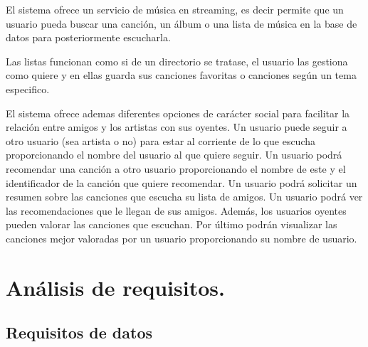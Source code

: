 \documentclass[12pt,a4paper]{article}
\begin{document}
El sistema ofrece un servicio de música en streaming, es decir permite que un usuario pueda buscar una canción, un álbum o una lista de música en la base 
de datos para posteriormente escucharla. 

Las listas funcionan como si de un directorio se tratase, el usuario las gestiona como quiere y en ellas guarda sus canciones favoritas o canciones según un tema especifico.  

El sistema ofrece ademas diferentes opciones de carácter social para facilitar la relación entre amigos y los artistas con sus oyentes. Un usuario puede seguir a otro usuario (sea artista o no) para estar al corriente de lo que escucha proporcionando el nombre del usuario al que quiere seguir. Un usuario podrá recomendar una canción a otro usuario proporcionando el nombre de este y el identificador de la canción que quiere recomendar. Un usuario podrá solicitar un resumen sobre las canciones que escucha su lista de amigos. 
Un usuario podrá ver las recomendaciones que le llegan de sus amigos. Además, los usuarios oyentes pueden valorar las canciones que escuchan. Por último podrán visualizar las canciones mejor valoradas por un usuario proporcionando su nombre de usuario.

\section{Análisis de requisitos.}

\subsection{Requisitos de datos}
\end{document}
